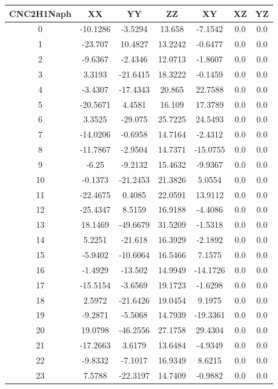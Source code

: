 \begin{table}
\tiny
\centering
   \begin{tabular}{ccccccc}
    \hline
CNC2H1Naph & XX & YY & ZZ & XY &  XZ & YZ \\
\hline
0 & -10.1286 & -3.5294 & 13.658 & -7.1542 & 0.0 & 0.0 \\ 
1 & -23.707 & 10.4827 & 13.2242 & -0.6477 & 0.0 & 0.0 \\ 
2 & -9.6367 & -2.4346 & 12.0713 & -1.8607 & 0.0 & 0.0 \\ 
3 & 3.3193 & -21.6415 & 18.3222 & -0.1459 & 0.0 & 0.0 \\ 
4 & -3.4307 & -17.4343 & 20.865 & 22.7588 & 0.0 & 0.0 \\ 
5 & -20.5671 & 4.4581 & 16.109 & 17.3789 & 0.0 & 0.0 \\ 
6 & 3.3525 & -29.075 & 25.7225 & 24.5493 & 0.0 & 0.0 \\ 
7 & -14.0206 & -0.6958 & 14.7164 & -2.4312 & 0.0 & 0.0 \\ 
8 & -11.7867 & -2.9504 & 14.7371 & -15.0755 & 0.0 & 0.0 \\ 
9 & -6.25 & -9.2132 & 15.4632 & -9.9367 & 0.0 & 0.0 \\ 
10 & -0.1373 & -21.2453 & 21.3826 & 5.0554 & 0.0 & 0.0 \\ 
11 & -22.4675 & 0.4085 & 22.0591 & 13.9112 & 0.0 & 0.0 \\ 
12 & -25.4347 & 8.5159 & 16.9188 & -4.4086 & 0.0 & 0.0 \\ 
13 & 18.1469 & -49.6679 & 31.5209 & -1.5318 & 0.0 & 0.0 \\ 
14 & 5.2251 & -21.618 & 16.3929 & -2.1892 & 0.0 & 0.0 \\ 
15 & -5.9402 & -10.6064 & 16.5466 & 7.1575 & 0.0 & 0.0 \\ 
16 & -1.4929 & -13.502 & 14.9949 & -14.1726 & 0.0 & 0.0 \\ 
17 & -15.5154 & -3.6569 & 19.1723 & -1.6298 & 0.0 & 0.0 \\ 
18 & 2.5972 & -21.6426 & 19.0454 & 9.1975 & 0.0 & 0.0 \\ 
19 & -9.2871 & -5.5068 & 14.7939 & -19.3361 & 0.0 & 0.0 \\ 
20 & 19.0798 & -46.2556 & 27.1758 & 29.4304 & 0.0 & 0.0 \\ 
21 & -17.2663 & 3.6179 & 13.6484 & -4.9349 & 0.0 & 0.0 \\ 
22 & -9.8332 & -7.1017 & 16.9349 & 8.6215 & 0.0 & 0.0 \\ 
23 & 7.5788 & -22.3197 & 14.7409 & -0.9882 & 0.0 & 0.0 \\ 

\end{tabular}
\end{table}
